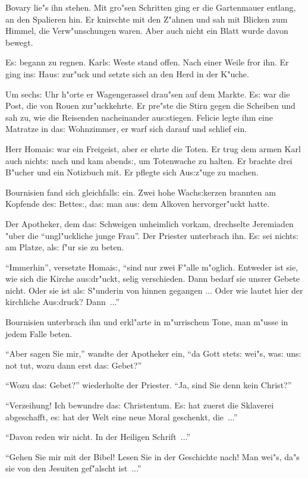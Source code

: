 \documentclass[oneside,12pt]{book}
\newcommand{\s}{s:}%
\begin{document}
Bovary lie"s ihn stehen. Mit gro"sen Schritten ging er die
Gartenmauer entlang, an den Spalieren hin. Er knirschte mit den
Z"ahnen und sah mit Blicken zum Himmel, die Verw"unschungen waren.
Aber auch nicht ein Blatt wurde davon bewegt.

E{\s} begann zu regnen. Karl{\s} Weste stand offen. Nach einer
Weile fror ihn. Er ging in{\s} Hau{\s} zur"uck und setzte sich an
den Herd in der K"uche.

Um sech{\s} Uhr h"orte er Wagengerassel drau"sen auf dem Markte.
E{\s} war die Post, die von Rouen zur"uckkehrte. Er pre"ste die
Stirn gegen die Scheiben und sah zu, wie die Reisenden
nacheinander au{\s}stiegen. Felicie legte ihm eine Matratze in
da{\s} Wohnzimmer, er warf sich darauf und schlief ein.

Herr Homai{\s} war ein Freigeist, aber er ehrte die Toten. Er trug
dem armen Karl auch nicht{\s} nach und kam abend{\s}, um
Totenwache zu halten. Er brachte drei B"ucher und ein Notizbuch
mit. Er pflegte sich Au{\s}z"uge zu machen.

Bournisien fand sich gleichfall{\s} ein. Zwei hohe Wach{\s}kerzen
brannten am Kopfende de{\s} Bette{\s}, da{\s} man au{\s} dem
Alkoven hervorger"uckt hatte.

Der Apotheker, dem da{\s} Schweigen unheimlich vorkam, drechselte
Jeremiaden "uber die "`ungl"uckliche junge Frau"'. Der Priester
unterbrach ihn. E{\s} sei nicht{\s} am Platze, al{\s} f"ur sie zu
beten.

"`Immerhin"', versetzte Homai{\s}, "`sind nur zwei F"alle
m"oglich. Entweder ist sie, wie sich die Kirche au{\s}dr"uckt,
selig verschieden. Dann bedarf sie unsrer Gebete nicht. Oder sie
ist al{\s} S"underin von hinnen gegangen ... Oder wie lautet hier
der kirchliche Au{\s}druck? Dann~..."'

Bournisien unterbrach ihn und erkl"arte in m"urrischem Tone, man
m"usse in jedem Falle beten.

"`Aber sagen Sie mir,"' wandte der Apotheker ein, "`da Gott
stet{\s} wei"s, wa{\s} un{\s} not tut, wozu dann erst da{\s}
Gebet?"'

"`Wozu da{\s} Gebet?"' wiederholte der Priester. "`Ja, sind Sie
denn kein Christ?"'

"`Verzeihung! Ich bewundre da{\s} Christentum. E{\s} hat zuerst
die Sklaverei abgeschafft, e{\s} hat der Welt eine neue Moral
geschenkt, die~..."'

"`Davon reden wir nicht. In der Heiligen Schrift~..."'

"`Gehen Sie mir mit der Bibel! Lesen Sie in der Geschichte nach!
Man wei"s, da"s sie von den Jesuiten gef"alscht ist~..."'
\end{document}
